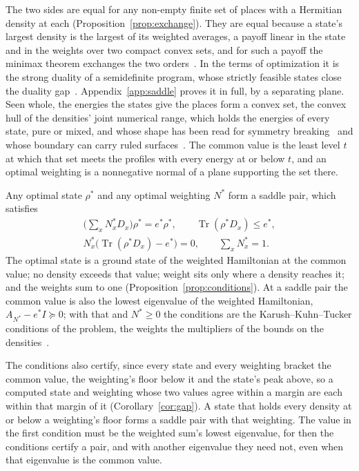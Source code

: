 \documentclass[aps,prd,reprint,superscriptaddress]{revtex4-2}
\begin{document}
The two sides are equal for any non-empty finite set of places with a Hermitian density at each (Proposition~\ref{prop:exchange}). They are equal because a state's largest density is the largest of its weighted averages, a payoff linear in the state and in the weights over two compact convex sets, and for such a payoff the minimax theorem exchanges the two orders~\cite{vonNeumann1928,Sion1958}. In the terms of optimization it is the strong duality of a semidefinite program, whose strictly feasible states close the duality gap~\cite{BoydVandenberghe2004}. Appendix~\ref{app:saddle} proves it in full, by a separating plane. Seen whole, the energies the states give the places form a convex set, the convex hull of the densities' joint numerical range, which holds the energies of every state, pure or mixed, and whose shape has been read for symmetry breaking~\cite{ZaunerEtAl2016} and whose boundary can carry ruled surfaces~\cite{ChenEtAl2017}. The common value is the least level $t$ at which that set meets the profiles with every energy at or below $t$, and an optimal weighting is a nonnegative normal of a plane supporting the set there.

Any optimal state $\rho^*$ and any optimal weighting $N^*$ form a saddle pair, which satisfies
\begin{equation}
\begin{gathered}
  \Big(\sum_x N^*_x D_x\Big)\rho^* = e^*\rho^*, \qquad \operatorname{Tr}(\rho^* D_x) \le e^*, \\
  N^*_x\big(\operatorname{Tr}(\rho^* D_x) - e^*\big) = 0, \qquad \sum_x N^*_x = 1 .
\end{gathered}
  \label{eq:conditions}
\end{equation}
The optimal state is a ground state of the weighted Hamiltonian at the common value; no density exceeds that value; weight sits only where a density reaches it; and the weights sum to one (Proposition~\ref{prop:conditions}). At a saddle pair the common value is also the lowest eigenvalue of the weighted Hamiltonian, $A_{N^*} - e^*I \succeq 0$; with that and $N^* \ge 0$ the conditions are the Karush--Kuhn--Tucker conditions of the problem, the weights the multipliers of the bounds on the densities~\cite{GiorgiKjeldsen2014,BoydVandenberghe2004}.

The conditions also certify, since every state and every weighting bracket the common value, the weighting's floor below it and the state's peak above, so a computed state and weighting whose two values agree within a margin are each within that margin of it (Corollary~\ref{cor:gap}). A state that holds every density at or below a weighting's floor forms a saddle pair with that weighting. The value in the first condition must be the weighted sum's lowest eigenvalue, for then the conditions certify a pair, and with another eigenvalue they need not, even when that eigenvalue is the common value.
\end{document}
